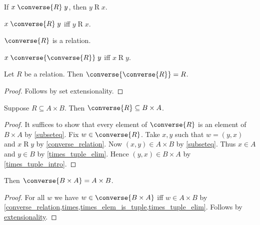 \begin{proposition}\label{converse_elim}
    If $x\mathrel{\converse{R}} y$, then $y\mathrel{R} x$.
\end{proposition}

\begin{proposition}\label{converse_iff}
    $x\mathrel{\converse{R}} y$ iff $y\mathrel{R} x$.
\end{proposition}


\begin{proposition}\label{converse_is_relation}
    $\converse{R}$ is a relation.
\end{proposition}


\begin{proposition}\label{converse_converse_iff}
    $x \mathrel{\converse{\converse{R}}} y$ iff $x\mathrel{R} y$.
\end{proposition}

\begin{proposition}\label{converse_converse_eq}
    Let $R$ be a relation.
    Then $\converse{\converse{R}} = R$.
\end{proposition}
\begin{proof}
    Follows by set extensionality.
\end{proof}

\begin{proposition}\label{converse_type}
    Suppose $R\subseteq A\times B$.
    Then $\converse{R}\subseteq B\times A$.
\end{proposition}
\begin{proof}
    It suffices to show that every element of $\converse{R}$ is an element of $B\times A$
        by \cref{subseteq}.
    Fix $w\in\converse{R}$.
    Take $x, y$ such that $w = (y, x)$ and $x\mathrel{R} y$ by \cref{converse_relation}.
    Now $(x,y)\in A\times B$ by \cref{subseteq}.
    Thus $x\in A$ and $y\in B$ by \cref{times_tuple_elim}.
    Hence $(y,x)\in B\times A$ by \cref{times_tuple_intro}.
\end{proof}

\begin{proposition}\label{converse_times}
    Then $\converse{B\times A} = A\times B$.
\end{proposition}
\begin{proof}
    For all $w$ we have $w\in\converse{B\times A}$ iff $w\in A\times B$
        by \cref{converse_relation,times,times_elem_is_tuple,times_tuple_elim}.
    Follows by \hyperref[setext]{extensionality}.
\end{proof}

